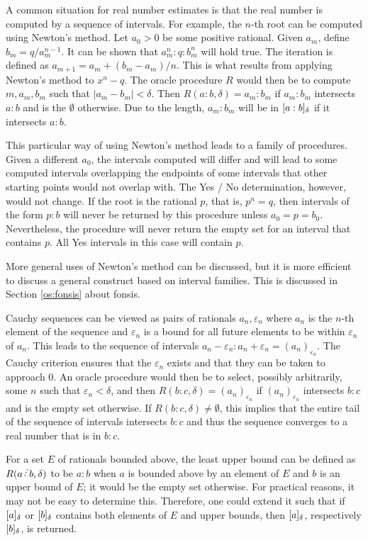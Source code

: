 \documentclass[12pt]{article}
\begin{document}
A common situation for real number estimates is that the real number is computed by a sequence of intervals. For example, the $n$-th root can be computed using Newton's method. Let $a_0 >0$ be some positive rational. Given $a_m$, define $b_m = q/a_m^{n-1}$. It can be shown that $a_m^n : q : b_m^n$ will hold true. The iteration is defined as $a_{m+1} = a_m + (b_m - a_m)/n$. This is what results from applying Newton's method to $x^n - q$. The oracle procedure $R$ would then be to compute $m, a_m, b_m$ such that $|a_m - b_m| < \delta$.  Then $R(a:b, \delta) = a_m:b_m$ if $a_m:b_m$ intersects $a:b$ and is the $\emptyset$ otherwise. Due to the length, $a_m:b_m$ will be in $[a:b]_{\delta}$ if it intersects $a:b$. 

This particular way of using Newton's method leads to a family of procedures. Given a different $a_0$, the intervals computed will differ and will lead to some computed intervals overlapping the endpoints of some intervals that other starting points would not overlap with. The Yes / No determination, however, would not  change. If the root is the rational $p$, that is, $p^n = q$,  then intervals of the form $p:b$ will never be returned by this procedure unless $a_0 = p = b_0$. Nevertheless, the procedure will never return the empty set for an interval that contains $p$. All Yes intervals in this case will contain $p$. 

More general uses of Newton's method can be discussed, but it is more efficient to discuss a general construct based on interval families. This is discussed in Section \ref{os:fonsis} about fonsis. 

Cauchy sequences can be viewed as pairs of rationals $a_n, \varepsilon_n$ where $a_n$ is the $n$-th element of the sequence and $\varepsilon_n$ is a bound for all future elements to be within $\varepsilon_n$ of $a_n$. This leads to the sequence of intervals $a_n-\varepsilon_n:a_n+\varepsilon_n = (a_n)_{\varepsilon_n}$. The Cauchy criterion ensures that the $\varepsilon_n$ exists and that they can be taken to approach 0. An oracle procedure would then be to select, possibly arbitrarily, some $n$ such that $\varepsilon_n < \delta$, and then  $R(b:c, \delta) = (a_n)_{\varepsilon_n}$ if $(a_n)_{\varepsilon_n}$ intersects $b:c$ and is the empty set otherwise. If $R(b:c, \delta) \neq \emptyset$, this implies that the entire tail of the sequence of intervals intersects $b:c$ and thus the sequence converges to a real number that is in $b:c$.  

For a set $E$ of rationals bounded above, the least upper bound can be defined as $R(a \lte b, \delta)$ to be $a:b$ when $a$ is bounded above by an element of $E$ and $b$ is an upper bound of $E$; it would be the empty set otherwise. For practical reasons, it may not be easy to determine this. Therefore, one could extend it such that if $[a]_{\delta}$ or $[b]_{\delta}$ contains both elements of $E$ and upper bounds, then $[a]_{\delta}$, respectively $[b]_{\delta}$, is returned. 
\end{document}
